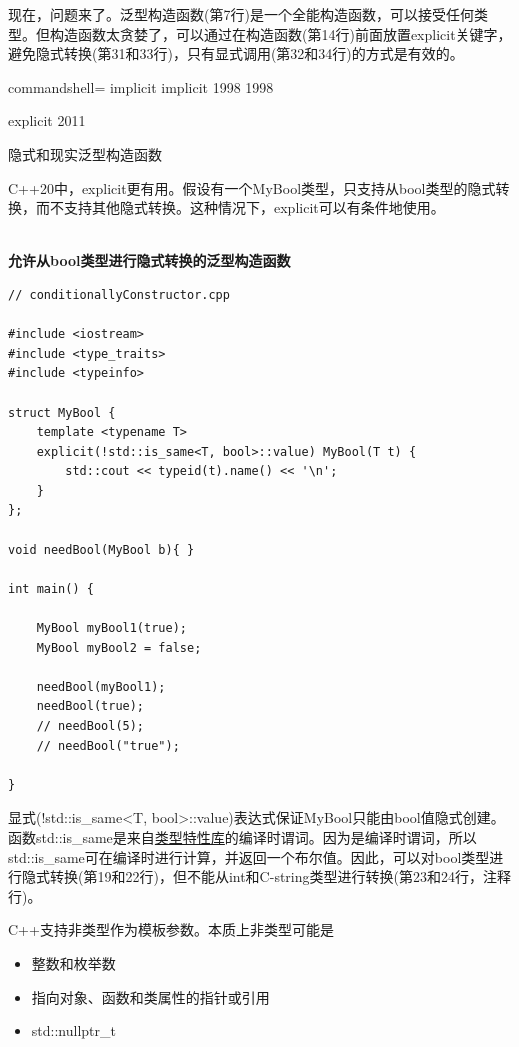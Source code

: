 现在，问题来了。泛型构造函数(第7行)是一个全能构造函数，可以接受任何类型。但构造函数太贪婪了，可以通过在构造函数(第14行)前面放置explicit关键字，避免隐式转换(第31和33行)，只有显式调用(第32和34行)的方式是有效的。

\begin{tcblisting}{commandshell={}}
implicit
implicit
1998
1998

explicit
2011
\end{tcblisting}

\begin{center}
隐式和现实泛型构造函数
\end{center}

C++20中，explicit更有用。假设有一个MyBool类型，只支持从bool类型的隐式转换，而不支持其他隐式转换。这种情况下，explicit可以有条件地使用。

\hspace*{\fill} \\ %
\noindent
\textbf{允许从bool类型进行隐式转换的泛型构造函数}
\begin{lstlisting}[style=styleCXX]
// conditionallyConstructor.cpp

#include <iostream>
#include <type_traits>
#include <typeinfo>

struct MyBool {
	template <typename T>
	explicit(!std::is_same<T, bool>::value) MyBool(T t) {
		std::cout << typeid(t).name() << '\n';
	}
};

void needBool(MyBool b){ }

int main() {

	MyBool myBool1(true);
	MyBool myBool2 = false;
	
	needBool(myBool1);
	needBool(true);
	// needBool(5);
	// needBool("true");

}
\end{lstlisting}

显式(!std::is\_same<T, bool>::value)表达式保证MyBool只能由bool值隐式创建。函数std::is\_same是来自\href{https://en.cppreference.com/w/cpp/header/type_traits}{类型特性库}的编译时谓词。因为是编译时谓词，所以std::is\_same可在编译时进行计算，并返回一个布尔值。因此，可以对bool类型进行隐式转换(第19和22行)，但不能从int和C-string类型进行转换(第23和24行，注释行)。


C++支持非类型作为模板参数。本质上非类型可能是

\begin{itemize}
\item 
整数和枚举数

\item 
指向对象、函数和类属性的指针或引用

\item 
std::nullptr\_t
\end{itemize}

